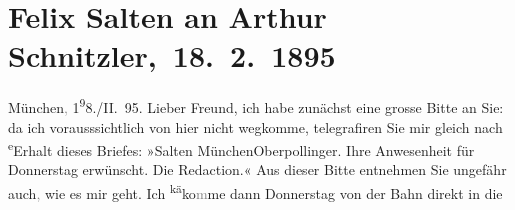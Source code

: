 

         
         \renewcommand{\erwaehntePersonen}{Personen: Hermann Bahr, Richard Beer-Hofmann, Otto Brahm, Julius von Gans-Ludassy, Hugo von Hofmannsthal, Maria Charlotte Lamberg, Charlotte Pohl-Glas, Felix Salten}
         \renewcommand{\erwaehnteInstitutionen}{Institutionen: Deutsches Theater Berlin, Wiener Musik- und Theatergesellschaft}
         \renewcommand{\erwaehnteOrte}{Orte: Hotel Oberpollinger, München, Volkstheater, Wien}
         \renewcommand{\erwaehnteWerke}{Werke: Adele Sandrock, Die Zeit. Wiener Wochenschrift, Liebelei. Schauspiel in drei Akten}
               \section[ Felix Salten an Arthur Schnitzler, 18. 2. 1895]{ Felix Salten an Arthur Schnitzler, 18. 2. 1895}\nopagebreak{}\rehead{ }\begin{ledgroupsized}[t]{13cm}\normalsize\beginnumbering{} \toendnotes[C]{\smallbreak\pagebreak[2]} 
\toendnotes[C]{\smallbreak}\pstart
           \raggedleft{}{\pb}München\textcolor{gray}{,}{ }1\substVorne{}\textsuperscript{9}\substDazwischen{}8\substHinten{}./II. 95.\pend
           \pstart
           Lieber Freund, ich habe zunächst eine grosse Bitte an
               Sie: da ich vorausssichtlich von hier nicht wegkomme, telegrafiren Sie mir gleich nach \substVorne{}\textsuperscript{e}\substDazwischen{}E\substHinten{}rhalt dieses Briefes: »Salten MünchenOberpollinger. Ihre Anwesenheit für Donnerstag erwünscht. Die Redaction.«\pend
           \pstart
           Aus dieser Bitte entnehmen Sie ungefähr auch\textcolor{gray}{,} wie es mir geht. Ich \substVorne{}\textsuperscript{kä}\substDazwischen{}ko\textcolor{gray}{m}\substHinten{}me dann Donnerstag von der Bahn direkt in die

\end{ledgroupsized}
